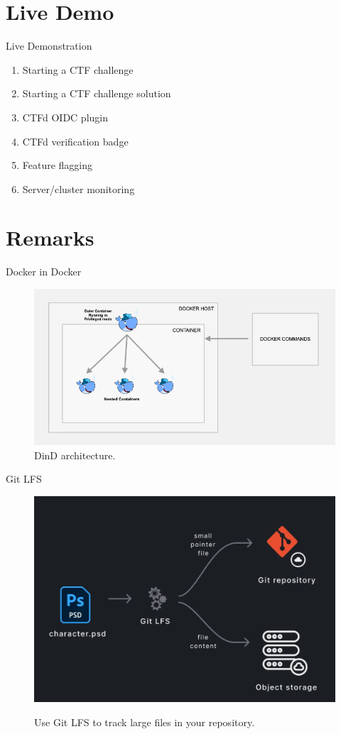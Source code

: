 \documentclass{beamer}
\begin{document}
\section{Live Demo}
\begin{frame}{Live Demonstration}
    \begin{enumerate}
        \item Starting a CTF challenge
        \item Starting a CTF challenge solution
        \item CTFd OIDC plugin
        \item CTFd verification badge
        \item Feature flagging
        \item Server/cluster monitoring
    \end{enumerate}
\end{frame}

\section{Remarks}
\begin{frame}{Docker in Docker}
    \begin{figure}
        \centering
        \includegraphics[width=.9\textwidth]{./images/docker-dind.png}
        \caption{DinD architecture.}
    \end{figure}
\end{frame}

\begin{frame}{Git LFS}
    \begin{figure}
        \centering
        \href{https://git-lfs.com/}{%
            \includegraphics[width=.9\textwidth]{./images/Git-LFS.png}
        }
        \caption{Use Git LFS to track large files in your repository.}
    \end{figure}
\end{frame}
\end{document}
